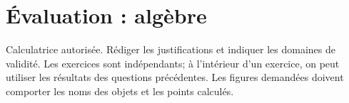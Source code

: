 \begingroup
\chapter*{Évaluation : algèbre}
\renewcommand{\thebmtexo}{DS2.\arabic{bmtexo}}
\renewcommand{\theHbmtexo}{DS2.\arabic{bmtexo}}
\setcounter{bmtexo}{0}
\begin{devoir}
Calculatrice autorisée. Rédiger les justifications et indiquer les domaines de validité. Les exercices sont indépendants; à l’intérieur d’un exercice, on peut utiliser les résultats des questions précédentes. Les figures demandées doivent comporter les noms des objets et les points calculés.
\end{devoir}

